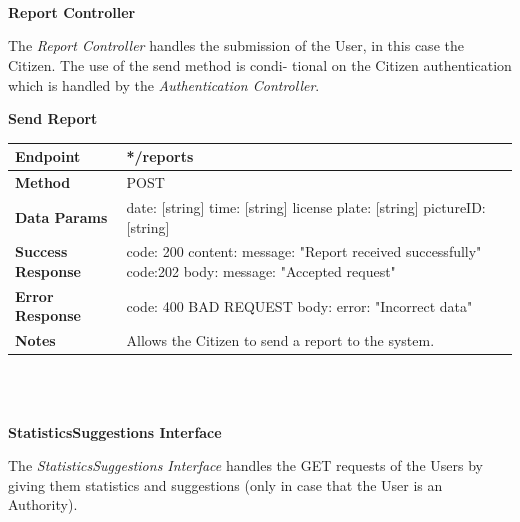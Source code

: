 \documentclass{report}
\begin{document}
\\
\\\\
\begin{center}\large{\textbf{Report Controller}}\end{center}
The \textit{Report Controller} handles the submission of the User, in this case the Citizen. The use of the send method is condi-
tional on the Citizen authentication which is handled by the \textit{Authentication Controller}.\\

\begin{center}{\textbf{Send Report}}\end{center}
    \begin{tabular}{| l | p{8cm} |}
        \hline
        \textbf{Endpoint} & */reports\\
        \hline
        \textbf{Method} & POST \\
        \hline
        \textbf{Data Params} & date: [string] \newline time: [string] \newline license plate: [string] \newline pictureID: [string]\\
        \hline
        \textbf{Success Response} &  code: 200 \newline content: {message: "Report received successfully"} \newline \newline code:202 \newline body: {message: "Accepted request"}\\
        \hline
        \textbf{Error Response} & code: 400 BAD REQUEST \newline body: {error: "Incorrect data"}\\
        \hline
        \textbf{Notes} & Allows the Citizen to send a report to the system. \\
        \hline
    \end{tabular}
\\\\
\begin{center}\large{\textbf{StatisticsSuggestions Interface}}\end{center}
The \textit{StatisticsSuggestions Interface} handles the GET requests of the Users by giving them statistics and suggestions (only in case that the User is an Authority).
\end{document}

